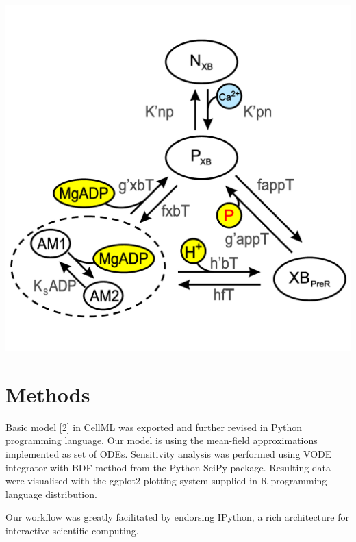 \documentclass[a0,portrait]{a0poster}
\begin{document}
\begin{multicols}{2}
\begin{center}%
\includegraphics[scale=0.95]{cross-bridge_scheme_v2}
\end{center}%


\section*{Methods}

Basic model [2] in CellML was exported and further revised in
Python programming language. Our model is using the mean-field
approximations implemented as set of ODEs. Sensitivity analysis was
performed using VODE integrator with BDF method from the Python SciPy
package. Resulting data were visualised with the ggplot2 plotting system
supplied in R programming language distribution. 

Our workflow was greatly facilitated by endorsing IPython, a rich
architecture for interactive scientific computing.


\end{multicols}
\end{document}
